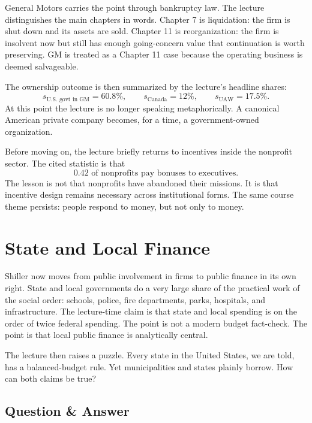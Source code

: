 General Motors carries the point through bankruptcy law. The lecture distinguishes the main chapters in words. Chapter 7 is liquidation: the firm is shut down and its assets are sold. Chapter 11 is reorganization: the firm is insolvent now but still has enough going-concern value that continuation is worth preserving. GM is treated as a Chapter 11 case because the operating business is deemed salvageable.

The ownership outcome is then summarized by the lecture's headline shares:
\begin{equation}
s_{\text{U.S. govt in GM}}=60.8\%,
\qquad
s_{\text{Canada}}=12\%,
\qquad
s_{\text{UAW}}=17.5\%.
\end{equation}
At this point the lecture is no longer speaking metaphorically. A canonical American private company becomes, for a time, a government-owned organization.

Before moving on, the lecture briefly returns to incentives inside the nonprofit sector. The cited statistic is that
\begin{equation}
0.42 \text{ of nonprofits pay bonuses to executives.}
\end{equation}
The lesson is not that nonprofits have abandoned their missions. It is that incentive design remains necessary across institutional forms. The same course theme persists: people respond to money, but not only to money.

\section{State and Local Finance}

Shiller now moves from public involvement in firms to public finance in its own right. State and local governments do a very large share of the practical work of the social order: schools, police, fire departments, parks, hospitals, and infrastructure. The lecture-time claim is that state and local spending is on the order of twice federal spending. The point is not a modern budget fact-check. The point is that local public finance is analytically central.

The lecture then raises a puzzle. Every state in the United States, we are told, has a balanced-budget rule. Yet municipalities and states plainly borrow. How can both claims be true?

\subsection{Question \& Answer}

